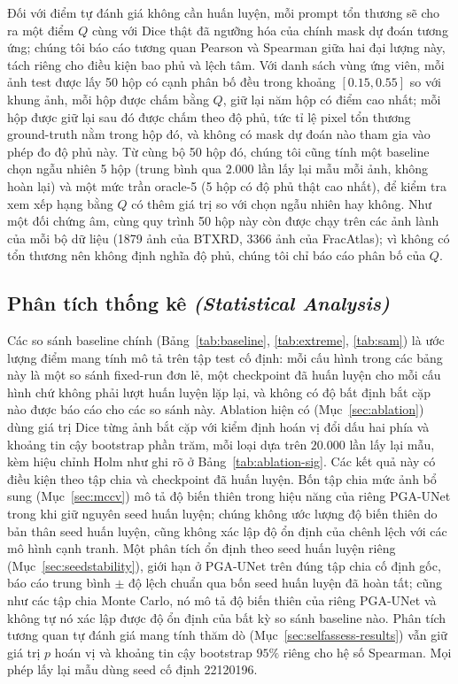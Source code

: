 \documentclass[11pt]{article}
\newcommand{\enlabel}[1]{{\small\itshape\color{gray} (#1)}}
\begin{document}
Đối với điểm tự đánh giá không cần huấn luyện, mỗi prompt tổn thương sẽ cho ra một điểm $Q$ cùng với Dice thật đã ngưỡng hóa của chính mask dự đoán tương ứng; chúng tôi báo cáo tương quan Pearson và Spearman giữa hai đại lượng này, tách riêng cho điều kiện bao phủ và lệch tâm. Với danh sách vùng ứng viên, mỗi ảnh test được lấy 50 hộp có cạnh phân bố đều trong khoảng $[0.15,0.55]$ so với khung ảnh, mỗi hộp được chấm bằng $Q$, giữ lại năm hộp có điểm cao nhất; mỗi hộp được giữ lại sau đó được chấm theo độ phủ, tức tỉ lệ pixel tổn thương ground-truth nằm trong hộp đó, và không có mask dự đoán nào tham gia vào phép đo độ phủ này. Từ cùng bộ 50 hộp đó, chúng tôi cũng tính một baseline chọn ngẫu nhiên 5 hộp (trung bình qua 2.000 lần lấy lại mẫu mỗi ảnh, không hoàn lại) và một mức trần oracle-5 (5 hộp có độ phủ thật cao nhất), để kiểm tra xem xếp hạng bằng $Q$ có thêm giá trị so với chọn ngẫu nhiên hay không. Như một đối chứng âm, cùng quy trình 50 hộp này còn được chạy trên các ảnh lành của mỗi bộ dữ liệu (1879 ảnh của BTXRD, 3366 ảnh của FracAtlas); vì không có tổn thương nên không định nghĩa độ phủ, chúng tôi chỉ báo cáo phân bố của $Q$.

\subsection{Phân tích thống kê \enlabel{Statistical Analysis}}
Các so sánh baseline chính (Bảng~\ref{tab:baseline}, \ref{tab:extreme}, \ref{tab:sam}) là ước lượng điểm mang tính mô tả trên tập test cố định: mỗi cấu hình trong các bảng này là một so sánh fixed-run đơn lẻ, một checkpoint đã huấn luyện cho mỗi cấu hình chứ không phải lượt huấn luyện lặp lại, và không có độ bất định bắt cặp nào được báo cáo cho các so sánh này. Ablation hiện có (Mục~\ref{sec:ablation}) dùng giá trị Dice từng ảnh bắt cặp với kiểm định hoán vị đổi dấu hai phía và khoảng tin cậy bootstrap phần trăm, mỗi loại dựa trên $20{.}000$ lần lấy lại mẫu, kèm hiệu chỉnh Holm như ghi rõ ở Bảng~\ref{tab:ablation-sig}. Các kết quả này có điều kiện theo tập chia và checkpoint đã huấn luyện. Bốn tập chia mức ảnh bổ sung (Mục~\ref{sec:mccv}) mô tả độ biến thiên trong hiệu năng của riêng PGA-UNet trong khi giữ nguyên seed huấn luyện; chúng không ước lượng độ biến thiên do bản thân seed huấn luyện, cũng không xác lập độ ổn định của chênh lệch với các mô hình cạnh tranh. Một phân tích ổn định theo seed huấn luyện riêng (Mục~\ref{sec:seedstability}), giới hạn ở PGA-UNet trên đúng tập chia cố định gốc, báo cáo trung bình $\pm$ độ lệch chuẩn qua bốn seed huấn luyện đã hoàn tất; cũng như các tập chia Monte Carlo, nó mô tả độ biến thiên của riêng PGA-UNet và không tự nó xác lập được độ ổn định của bất kỳ so sánh baseline nào. Phân tích tương quan tự đánh giá mang tính thăm dò (Mục~\ref{sec:selfassess-results}) vẫn giữ giá trị $p$ hoán vị và khoảng tin cậy bootstrap $95\%$ riêng cho hệ số Spearman. Mọi phép lấy lại mẫu dùng seed cố định 22120196.
\end{document}
